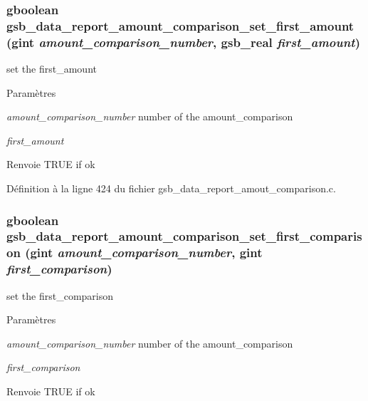 \subsubsection[{gsb\_\-data\_\-report\_\-amount\_\-comparison\_\-set\_\-first\_\-amount}]{\setlength{\rightskip}{0pt plus 5cm}gboolean gsb\_\-data\_\-report\_\-amount\_\-comparison\_\-set\_\-first\_\-amount (gint {\em amount\_\-comparison\_\-number}, \/  {\bf gsb\_\-real} {\em first\_\-amount})}\label{gsb__data__report__amout__comparison_8h_a1c4b398e3b439b02ce732e3ac21dc9e5}
set the first\_\-amount


\begin{DoxyParams}{Paramètres}
\item[{\em amount\_\-comparison\_\-number}]number of the amount\_\-comparison \item[{\em first\_\-amount}]\end{DoxyParams}
\begin{DoxyReturn}{Renvoie}
TRUE if ok 
\end{DoxyReturn}


Définition à la ligne 424 du fichier gsb\_\-data\_\-report\_\-amout\_\-comparison.c.

\subsubsection[{gsb\_\-data\_\-report\_\-amount\_\-comparison\_\-set\_\-first\_\-comparison}]{\setlength{\rightskip}{0pt plus 5cm}gboolean gsb\_\-data\_\-report\_\-amount\_\-comparison\_\-set\_\-first\_\-comparison (gint {\em amount\_\-comparison\_\-number}, \/  gint {\em first\_\-comparison})}\label{gsb__data__report__amout__comparison_8h_ad95131531a1d7eb83d7ca876a705f343}
set the first\_\-comparison


\begin{DoxyParams}{Paramètres}
\item[{\em amount\_\-comparison\_\-number}]number of the amount\_\-comparison \item[{\em first\_\-comparison}]\end{DoxyParams}
\begin{DoxyReturn}{Renvoie}
TRUE if ok 
\end{DoxyReturn}


